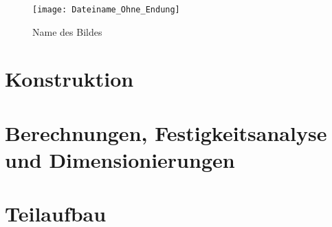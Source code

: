 \begin{wrapfigure}{r}{0.6\textwidth}
    \vspace{10pt}
    \begin{center}
        \texttt{[image: Dateiname\_Ohne\_Endung]}
    \end{center}
    \caption{Name des Bildes}
    \label{fig:verweis}
    \vspace{-10pt}
\end{wrapfigure}
\section{Konstruktion}

\section{Berechnungen, Festigkeitsanalyse und Dimensionierungen}

\section{Teilaufbau}
